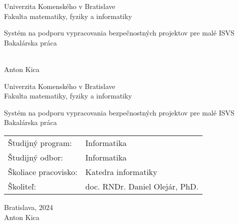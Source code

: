 \documentclass[12pt, twoside]{book}
\def\mfrok{2024}
\def\mfnazov{Systém na podporu vypracovania bezpečnostných projektov pre malé ISVS}
\def\mftyp{Bakalárska práca}
\def\mfautor{Anton Kica}
\def\mfskolitel{doc. RNDr. Daniel Olejár, PhD.}
\def\mfmiesto{Bratislava, \mfrok}
\def\mfodbor{Informatika}
\def\program{Informatika}
\def\mfpracovisko{Katedra informatiky}
\begin{document}
     
\frontmatter
\pagestyle{empty}


\begin{center}
\sc\large
Univerzita Komenského v Bratislave\\
Fakulta matematiky, fyziky a informatiky

\vfill

{\LARGE\mfnazov}\\
\mftyp
\end{center}

\vfill

{\sc\large 
\noindent \mfrok\\
\mfautor
}

\cleardoublepage



\noindent

\begin{center}
\sc  
\large
Univerzita Komenského v Bratislave\\
Fakulta matematiky, fyziky a informatiky

\vfill

{\LARGE\mfnazov}\\
\mftyp
\end{center}

\vfill

\noindent
\begin{tabular}{ll}
Študijný program: & \program \\
Študijný odbor: & \mfodbor \\
Školiace pracovisko: & \mfpracovisko \\
Školiteľ: & \mfskolitel \\
\end{tabular}

\vfill


\noindent \mfmiesto\\
\mfautor

\cleardoublepage



\newpage 
\setcounter{page}{3}


\end{document}
